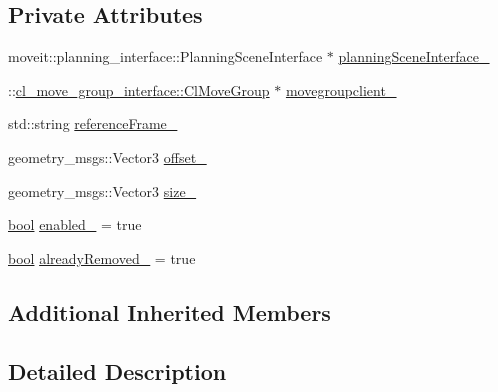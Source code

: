 \subsection*{Private Attributes}
\begin{DoxyCompactItemize}
\item 
moveit\+::planning\+\_\+interface\+::\+Planning\+Scene\+Interface $\ast$ \hyperlink{classsm__fetch__six__table__pick__n__sort__1_1_1cl__move__group__interface_1_1CpConstraintVirtualSideWall_a691e884fffbc5e310745d0ac1fc594b4}{planning\+Scene\+Interface\+\_\+}
\item 
\+::\hyperlink{classcl__move__group__interface_1_1ClMoveGroup}{cl\+\_\+move\+\_\+group\+\_\+interface\+::\+Cl\+Move\+Group} $\ast$ \hyperlink{classsm__fetch__six__table__pick__n__sort__1_1_1cl__move__group__interface_1_1CpConstraintVirtualSideWall_a5a22f10094eddc66ee4323097e3958f4}{movegroupclient\+\_\+}
\item 
std\+::string \hyperlink{classsm__fetch__six__table__pick__n__sort__1_1_1cl__move__group__interface_1_1CpConstraintVirtualSideWall_ac40d9e21604237c88121c3d4b116ce39}{reference\+Frame\+\_\+}
\item 
geometry\+\_\+msgs\+::\+Vector3 \hyperlink{classsm__fetch__six__table__pick__n__sort__1_1_1cl__move__group__interface_1_1CpConstraintVirtualSideWall_aed69dc67bef1900a254e55031244a881}{offset\+\_\+}
\item 
geometry\+\_\+msgs\+::\+Vector3 \hyperlink{classsm__fetch__six__table__pick__n__sort__1_1_1cl__move__group__interface_1_1CpConstraintVirtualSideWall_ad2633a49d0ab512b901fc5b63aae26f1}{size\+\_\+}
\item 
\hyperlink{classbool}{bool} \hyperlink{classsm__fetch__six__table__pick__n__sort__1_1_1cl__move__group__interface_1_1CpConstraintVirtualSideWall_a9018eb6e7d9b369e39ad70315192ab92}{enabled\+\_\+} = true
\item 
\hyperlink{classbool}{bool} \hyperlink{classsm__fetch__six__table__pick__n__sort__1_1_1cl__move__group__interface_1_1CpConstraintVirtualSideWall_a951469ee4d4da92580c5a9604800a2ce}{already\+Removed\+\_\+} = true
\end{DoxyCompactItemize}
\subsection*{Additional Inherited Members}


\subsection{Detailed Description}


